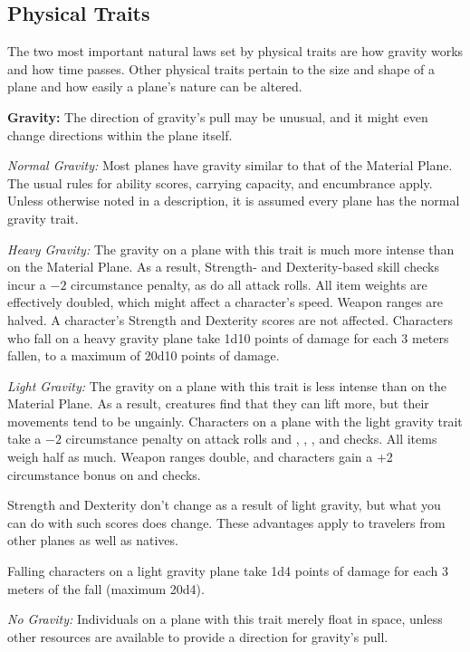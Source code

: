 \subsection{Physical Traits}
The two most important natural laws set by physical traits are how gravity works and how time passes. Other physical traits pertain to the size and shape of a plane and how easily a plane's nature can be altered.

\textbf{Gravity:} The direction of gravity's pull may be unusual, and it might even change directions within the plane itself.

\textit{Normal Gravity:} Most planes have gravity similar to that of the Material Plane. The usual rules for ability scores, carrying capacity, and encumbrance apply. Unless otherwise noted in a description, it is assumed every plane has the normal gravity trait.

\textit{Heavy Gravity:} The gravity on a plane with this trait is much more intense than on the Material Plane. As a result, Strength- and Dexterity-based skill checks incur a $-2$ circumstance penalty, as do all attack rolls. All item weights are effectively doubled, which might affect a character's speed. Weapon ranges are halved. A character's Strength and Dexterity scores are not affected. Characters who fall on a heavy gravity plane take 1d10 points of damage for each 3 meters fallen, to a maximum of 20d10 points of damage.

\textit{Light Gravity:} The gravity on a plane with this trait is less intense than on the Material Plane. As a result, creatures find that they can lift more, but their movements tend to be ungainly. Characters on a plane with the light gravity trait take a $-2$ circumstance penalty on attack rolls and , , , and  checks. All items weigh half as much. Weapon ranges double, and characters gain a +2 circumstance bonus on  and  checks.

Strength and Dexterity don't change as a result of light gravity, but what you can do with such scores does change. These advantages apply to travelers from other planes as well as natives.

Falling characters on a light gravity plane take 1d4 points of damage for each 3 meters of the fall (maximum 20d4).

\textit{No Gravity:} Individuals on a plane with this trait merely float in space, unless other resources are available to provide a direction for gravity's pull.

